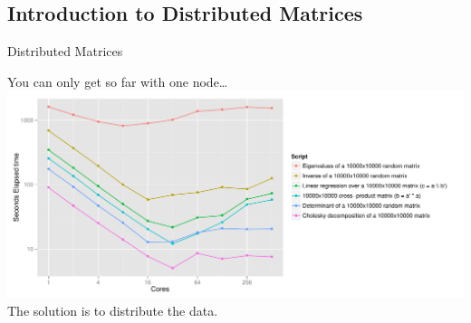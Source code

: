 \subsection{Introduction to Distributed Matrices}
\makesubcontentsslidessec


\begin{frame}
  \begin{block}{Distributed Matrices}\pause
  \begin{center}
  You can only get so far with one node\dots\\[.4cm]
    \includegraphics[width=.95\textwidth]{../common/pics/r_mkl_times}
    \\[.4cm]
    The solution is to distribute the data.
  \end{center}
  \end{block}
\end{frame}


% 
% 



